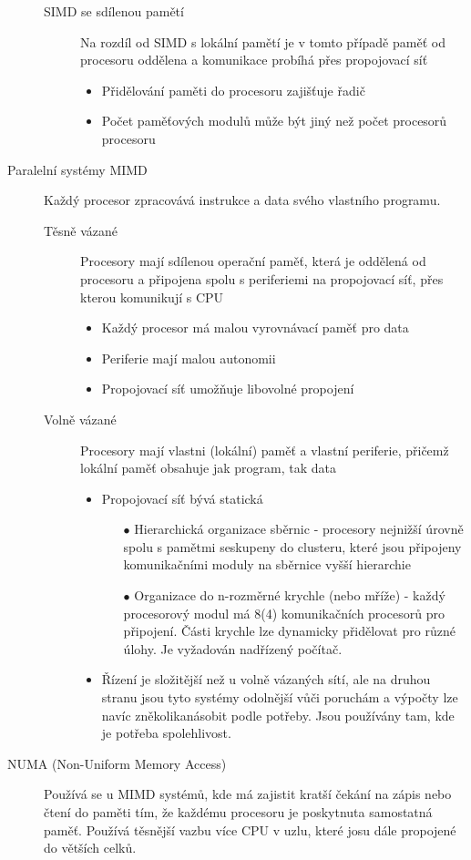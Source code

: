 \documentclass[10pt,a4paper,openright]{article}
\begin{document}
\begin{description}
\begin{description}
\item[SIMD se sdílenou pamětí] Na rozdíl od SIMD s lokální pamětí je v tomto případě paměť od procesoru oddělena a komunikace probíhá přes propojovací síť
	\begin{itemize}
	\item Přidělování paměti do procesoru zajišťuje řadič
	\item Počet paměťových modulů může být jiný než počet procesorů procesoru
	\end{itemize}
\end{description}

\item[Paralelní systémy MIMD] Každý procesor zpracovává instrukce a data svého vlastního programu.
\begin{description}
\item[Těsně vázané] Procesory mají sdílenou operační paměť, která je oddělená od procesoru a připojena spolu s periferiemi na propojovací síť, přes kterou komunikují s CPU
	\begin{itemize}
	\item Každý procesor má malou vyrovnávací paměť pro data
	\item Periferie mají malou autonomii
	\item Propojovací síť umožňuje libovolné propojení
	\end{itemize}
\item[Volně vázané]Procesory mají vlastni (lokální) paměť a vlastní periferie, přičemž lokální paměť obsahuje jak program, tak data
	\begin{itemize}
	\item Propojovací síť bývá statická
	\begin{itemize}
		\item[$\bullet$] Hierarchická organizace sběrnic - procesory nejnižší úrovně spolu s pamětmi seskupeny do clusteru, které jsou připojeny komunikačními moduly na sběrnice vyšší hierarchie
		\item[$\bullet$] Organizace do n-rozměrné krychle (nebo mříže) - každý procesorový modul má 8(4) komunikačních procesorů pro připojení. Části krychle lze dynamicky přidělovat pro různé úlohy. Je vyžadován nadřízený počítač.
		\end{itemize}
	\item Řízení je složitější než u volně vázaných sítí, ale na druhou stranu jsou tyto systémy odolnější vůči poruchám a výpočty lze navíc zněkolikanásobit podle potřeby. Jsou používány tam, kde je potřeba spolehlivost.
	\end{itemize}
\end{description}

\item[NUMA (Non-Uniform Memory Access)] Používá se u MIMD systémů, kde má zajistit kratší čekání na zápis nebo čtení do paměti tím, že každému procesoru je poskytnuta samostatná paměť. Používá těsnější vazbu více CPU v uzlu, které josu dále propojené do větších celků.
\end{description}
\end{document}
